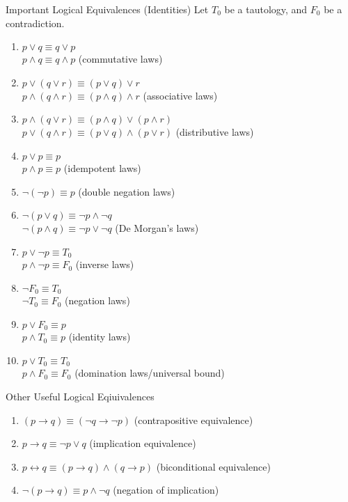 \documentclass[\main/notes.tex]{subfiles}
\begin{document}
			\begin{sidenote}{Important Logical Equivalences (Identities)}
				Let $T_{0}$ be a tautology, and $F_{0}$ be a contradiction.
				\begin{enumerate}[label=(\alph*), labelsep=2.5em, leftmargin=*]
					\item $p \lor q \equiv q \lor p$\\
						$p \land q \equiv q \land p$ \hfill (commutative laws)
					\item $p \lor (q \lor r) \equiv (p \lor q) \lor r$\\
						$p \land (q \land r) \equiv (p \land q) \land r$ \hfill (associative laws)
					\item $p \land (q \lor r) \equiv (p \land q) \lor (p \land r)$\\
						$ p \lor (q \land r) \equiv (p \lor q) \land (p \lor r)$ \hfill (distributive laws)
					\item $p \lor p \equiv p$\\
						$ p \land p \equiv p$ \hfill (idempotent laws)
					\item $\lnot (\lnot p) \equiv p$ \hfill (double negation laws)
					\item $\lnot (p \lor q) \equiv \lnot p \land \lnot q$ \\
						$ \lnot (p \land q) \equiv \lnot p \lor \lnot q$ \hfill(De Morgan's laws)
					\item $p \lor \lnot p \equiv T_{0}$\\
						$p \land \lnot p \equiv F_{0} $ \hfill (inverse laws)
					\item $\lnot F_{0} \equiv T_{0}$\\
						$\lnot T_{0} \equiv F_{0} $ \hfill (negation laws)
					\item $p \lor F_{0} \equiv p$\\
						$p \land T_{0} \equiv p$ \hfill (identity laws)
					\item $p \lor T_{0} \equiv T_{0}$\\
						$p \land F_{0} \equiv F_{0}$ \hfill (domination laws/universal bound)
				\end{enumerate}
			\end{sidenote}
			\begin{sidenote}{Other Useful Logical Eqiuivalences}
				\begin{enumerate}[label=(\alph*), labelsep=2.5em, leftmargin=*]
					\item $(p \rightarrow q) \equiv (\lnot q \rightarrow \lnot p)$ \hfill (contrapositive equivalence)
					\item $p \rightarrow q \equiv \lnot p \lor q$ \hfill (implication equivalence)
					\item $p \leftrightarrow q \equiv (p \rightarrow q) \land (q \rightarrow p)$ \hfill (biconditional equivalence)
					\item $\lnot (p \rightarrow q) \equiv p \land \lnot q$ \hfill (negation of implication)
				\end{enumerate}
			\end{sidenote}
\end{document}
